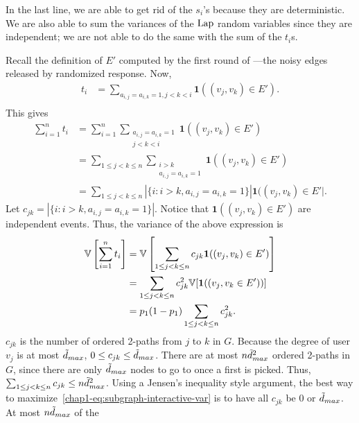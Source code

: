 {  In the last line, we are able to get rid of the $s_i$'s because they are
  deterministic. We are also able to sum the variances of the $\textrm{Lap}$ random
  variables since they are independent; we are not able to do the same with the
  sum of the $t_i$s. 

  Recall the definition of $E'$ computed by the first round of
  ---the noisy edges released by randomized
  response. Now,
  \begin{align*}
    t_i &= \sum_{a_{i,j}=a_{i,k}=1, j<k<i} \textbf{1}((v_j,v_k) \in E'). \\
  \end{align*}
  This gives
  \begin{align*}
    \sum_{i=1}^n t_i &= \sum_{i=1}^n\sum_{\substack{a_{i,j}=a_{i,k}=1 \\ j<k<i }} \textbf{1}((v_j,v_k) \in
    E') \\
    &= \sum_{1 \leq j < k \leq n} \sum_{\substack{i > k \\ a_{i,j}=a_{i,k}=1
    }} \textbf{1}((v_j,v_k) \in E') \\
    &= \sum_{1 \leq j < k \leq n} |\{i : i>k, a_{i,j}=a_{i,k}=1\}| \textbf{1}((v_j,v_k)
    \in E'|.
  \end{align*}
  Let $c_{jk} = |\{i : i>k, a_{i,j}=a_{i,k}=1\}|$. Notice that $\textbf{1}( (v_j,v_k) \in E')$
  are independent events. Thus, the variance of the above expression is
  \begin{align}
    \mathbb{V}\left[\sum_{i=1}^n t_i\right] &= 
    \mathbb{V}
    \left[\sum_{1 \leq j < k \leq n}
    c_{jk} \textbf{1}( (v_j,v_k) \in E') \right] \nonumber \\
    &= \sum_{1 \leq j < k \leq n} c_{jk}^2 \mathbb{V}[\textbf{1}( (v_j,v_k \in E')) ]
    \nonumber \\
    &= p_1 (1-p_1) \sum_{1 \leq j < k \leq n} c_{jk}^2.
    \label{chap1-eq:subgraph-interactive-var}
  \end{align}
  $c_{jk}$ is the number of ordered 2-paths from $j$ to $k$ in $G$. Because 
  the degree of user $v_j$ is at most $\tilde{d}_{max}$, 
  $0 \leq c_{jk} \leq \tilde{d}_{max}$. There are at most
  $n\tilde{d}_{max}^2$ ordered
  2-paths in $G$, since there are only $\tilde{d}_{max}$ 
  nodes 
  to go to once a first is
  picked. Thus, $\sum_{1 \leq j < k \leq n} c_{jk} \leq n\tilde{d}_{max}^2$. Using a Jensen's inequality
  style argument, the best way to maximize~\eqref{chap1-eq:subgraph-interactive-var} is to have
  all $c_{jk}$ be $0$ or $\tilde{d}_{max}$. At most $n\tilde{d}_{max}$ of the 
}
